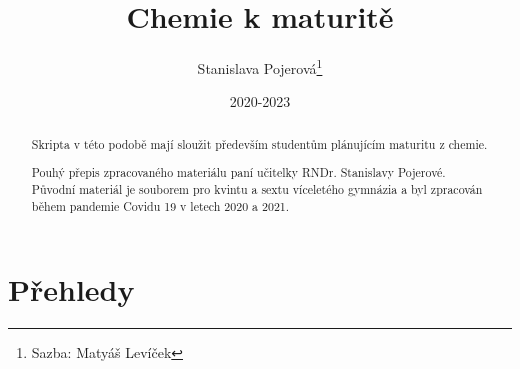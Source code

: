 \documentclass{article}
\title{Chemie k maturitě}
\author{Stanislava Pojerová\thanks{Sazba: Matyáš Levíček}}
\date{2020-2023}
\begin{document}
    \maketitle

    \begin{abstract}
        Skripta v této podobě mají sloužit především studentům plánujícím maturitu z chemie. 
        
        Pouhý přepis zpracovaného materiálu paní učitelky RNDr. Stanislavy Pojerové. Původní materiál je souborem pro kvintu a sextu víceletého gymnázia a byl zpracován během pandemie Covidu 19 v letech 2020 a 2021.
    \end{abstract}

    \newpage
    \renewcommand{\contentsname}{Obsah podle tématu}
    \tableofcontents
    \newpage
    
    
    
    
    
    
    
    
    
    
    
    
    
    
    
    
    
    
    
\newlength\origheight
\setlength\origheight{\textheight}



\section{Přehledy}
    
    
    
\end{document}
